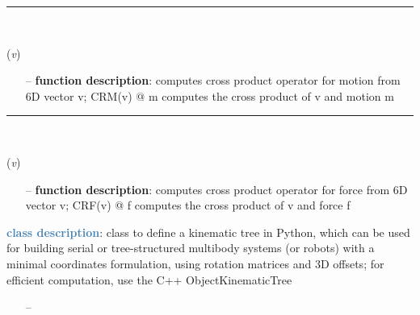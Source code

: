 \begin{itemize}[leftmargin=1.4cm]
\begin{itemize}[leftmargin=1.4cm]
\begin{itemize}[leftmargin=1.4cm]
\begin{itemize}[leftmargin=0.5cm]
\begin{itemize}[leftmargin=1.4cm]
\begin{itemize}[leftmargin=1.4cm]
\begin{itemize}[leftmargin=0.5cm]
\begin{itemize}[leftmargin=1.4cm]
\begin{itemize}[leftmargin=0.5cm]
\begin{itemize}[leftmargin=1.4cm]
\begin{itemize}[leftmargin=1.4cm]
\begin{itemize}[leftmargin=1.4cm]
%
\noindent\rule{8cm}{0.75pt}\vspace{1pt} \\ 
\begin{flushleft}
\label{sec:kinematicTree:CRM}
({\it v})
\end{flushleft}
\setlength{\itemindent}{0.7cm}
\begin{itemize}[leftmargin=0.7cm]
\item[--]
{\bf function description}: computes cross product operator for motion from 6D vector v; CRM(v) @ m computes the cross product of v and motion m
\vspace{12pt}\end{itemize}
%
\noindent\rule{8cm}{0.75pt}\vspace{1pt} \\ 
\begin{flushleft}
\label{sec:kinematicTree:CRF}
({\it v})
\end{flushleft}
\setlength{\itemindent}{0.7cm}
\begin{itemize}[leftmargin=0.7cm]
\item[--]
{\bf function description}: computes cross product operator for force from 6D vector v; CRF(v) @ f computes the cross product of v and force f
\vspace{12pt}\end{itemize}
%
\noindent\textcolor{steelblue}{{\bf class description}}:  class to define a kinematic tree in Python, which can be used for building serial or tree-structured multibody systems
         (or robots) with a minimal coordinates formulation, using rotation matrices and 3D offsets; for efficient computation, use the C++ ObjectKinematicTree
\setlength{\itemindent}{0.7cm}
\begin{itemize}[leftmargin=0.7cm]
\item[--]

\end{itemize}
\end{itemize}
\end{itemize}
\end{itemize}
\end{itemize}
\end{itemize}
\end{itemize}
\end{itemize}
\end{itemize}
\end{itemize}
\end{itemize}
\end{itemize}
\end{itemize}
